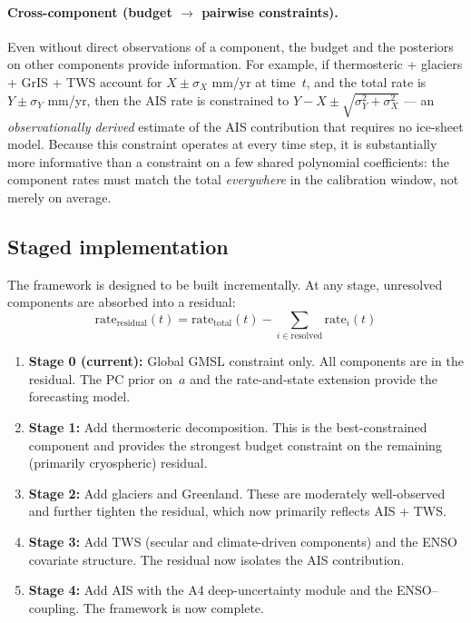 \documentclass[11pt]{article}
\newcommand{\CDW}{\text{CDW}}
\begin{document}
\paragraph{Cross-component (budget $\to$ pairwise constraints).}  Even without direct observations of a component, the budget and the posteriors on other components provide information.  For example, if thermosteric + glaciers + GrIS + TWS account for $X \pm \sigma_X$ mm/yr at time~$t$, and the total rate is $Y \pm \sigma_Y$ mm/yr, then the AIS rate is constrained to $Y - X \pm \sqrt{\sigma_Y^2 + \sigma_X^2}$ --- an \emph{observationally derived} estimate of the AIS contribution that requires no ice-sheet model.  Because this constraint operates at every time step, it is substantially more informative than a constraint on a few shared polynomial coefficients: the component rates must match the total \emph{everywhere} in the calibration window, not merely on average.

\subsection{Staged implementation}

The framework is designed to be built incrementally.  At any stage, unresolved components are absorbed into a residual:
\begin{equation}
  \text{rate}_{\text{residual}}(t) = \text{rate}_{\text{total}}(t) - \sum_{i \in \text{resolved}} \text{rate}_i(t)
\end{equation}

\begin{enumerate}
  \item \textbf{Stage 0 (current):} Global GMSL constraint only.  All components are in the residual.  The PC prior on~$a$ and the rate-and-state extension provide the forecasting model.

  \item \textbf{Stage 1:} Add thermosteric decomposition.  This is the best-constrained component and provides the strongest budget constraint on the remaining (primarily cryospheric) residual.

  \item \textbf{Stage 2:} Add glaciers and Greenland.  These are moderately well-observed and further tighten the residual, which now primarily reflects AIS + TWS.

  \item \textbf{Stage 3:} Add TWS (secular and climate-driven components) and the ENSO covariate structure.  The residual now isolates the AIS contribution.

  \item \textbf{Stage 4:} Add AIS with the A4 deep-uncertainty module and the ENSO--\CDW{} coupling.  The framework is now complete.
\end{enumerate}
\end{document}
